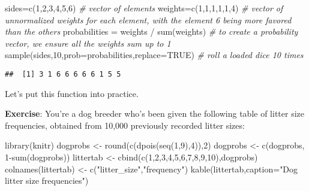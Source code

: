 \documentclass[
]{book}
\newenvironment{Shaded}{\begin{snugshade}}{\end{snugshade}}
\newcommand{\AttributeTok}[1]{\textcolor[rgb]{0.77,0.63,0.00}{#1}}
\newcommand{\CommentTok}[1]{\textcolor[rgb]{0.56,0.35,0.01}{\textit{#1}}}
\newcommand{\ConstantTok}[1]{\textcolor[rgb]{0.00,0.00,0.00}{#1}}
\newcommand{\DecValTok}[1]{\textcolor[rgb]{0.00,0.00,0.81}{#1}}
\newcommand{\FunctionTok}[1]{\textcolor[rgb]{0.00,0.00,0.00}{#1}}
\newcommand{\NormalTok}[1]{#1}
\newcommand{\OtherTok}[1]{\textcolor[rgb]{0.56,0.35,0.01}{#1}}
\newcommand{\SpecialCharTok}[1]{\textcolor[rgb]{0.00,0.00,0.00}{#1}}
\newcommand{\StringTok}[1]{\textcolor[rgb]{0.31,0.60,0.02}{#1}}
\begin{document}
\begin{Shaded}
\begin{Highlighting}[]
\NormalTok{sides}\OtherTok{=}\FunctionTok{c}\NormalTok{(}\DecValTok{1}\NormalTok{,}\DecValTok{2}\NormalTok{,}\DecValTok{3}\NormalTok{,}\DecValTok{4}\NormalTok{,}\DecValTok{5}\NormalTok{,}\DecValTok{6}\NormalTok{) }\CommentTok{\# vector of elements}
\NormalTok{weights}\OtherTok{=}\FunctionTok{c}\NormalTok{(}\DecValTok{1}\NormalTok{,}\DecValTok{1}\NormalTok{,}\DecValTok{1}\NormalTok{,}\DecValTok{1}\NormalTok{,}\DecValTok{1}\NormalTok{,}\DecValTok{4}\NormalTok{) }\CommentTok{\# vector of unnormalized weights for each element, with the element \textquotesingle{}6\textquotesingle{} being more favored than the others}
\NormalTok{probabilities }\OtherTok{=}\NormalTok{ weights }\SpecialCharTok{/} \FunctionTok{sum}\NormalTok{(weights) }\CommentTok{\# to create a probability vector, we ensure all the weights sum up to 1}
\FunctionTok{sample}\NormalTok{(sides,}\DecValTok{10}\NormalTok{,}\AttributeTok{prob=}\NormalTok{probabilities,}\AttributeTok{replace=}\ConstantTok{TRUE}\NormalTok{) }\CommentTok{\# roll a loaded dice 10 times}
\end{Highlighting}
\end{Shaded}

\begin{verbatim}
##  [1] 3 1 6 6 6 6 6 1 5 5
\end{verbatim}

Let's put this function into practice.

\textbf{Exercise}: You're a dog breeder who's been given the following table of litter size frequencies, obtained from 10,000 previously recorded litter sizes:

\begin{Shaded}
\begin{Highlighting}[]
\FunctionTok{library}\NormalTok{(knitr)}
\NormalTok{dogprobs }\OtherTok{\textless{}{-}} \FunctionTok{round}\NormalTok{(}\FunctionTok{c}\NormalTok{(}\FunctionTok{dpois}\NormalTok{(}\FunctionTok{seq}\NormalTok{(}\DecValTok{1}\NormalTok{,}\DecValTok{9}\NormalTok{),}\DecValTok{4}\NormalTok{)),}\DecValTok{2}\NormalTok{)}
\NormalTok{dogprobs }\OtherTok{\textless{}{-}} \FunctionTok{c}\NormalTok{(dogprobs, }\DecValTok{1}\SpecialCharTok{{-}}\FunctionTok{sum}\NormalTok{(dogprobs))}
\NormalTok{littertab }\OtherTok{\textless{}{-}} \FunctionTok{cbind}\NormalTok{(}\FunctionTok{c}\NormalTok{(}\DecValTok{1}\NormalTok{,}\DecValTok{2}\NormalTok{,}\DecValTok{3}\NormalTok{,}\DecValTok{4}\NormalTok{,}\DecValTok{5}\NormalTok{,}\DecValTok{6}\NormalTok{,}\DecValTok{7}\NormalTok{,}\DecValTok{8}\NormalTok{,}\DecValTok{9}\NormalTok{,}\DecValTok{10}\NormalTok{),dogprobs)}
\FunctionTok{colnames}\NormalTok{(littertab) }\OtherTok{\textless{}{-}} \FunctionTok{c}\NormalTok{(}\StringTok{"litter\_size"}\NormalTok{,}\StringTok{"frequency"}\NormalTok{)}
\FunctionTok{kable}\NormalTok{(littertab,}\AttributeTok{caption=}\StringTok{"Dog litter size frequencies"}\NormalTok{)}
\end{Highlighting}
\end{Shaded}
\end{document}
